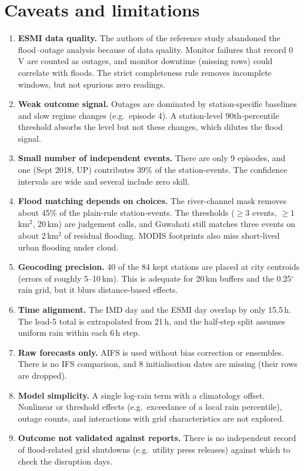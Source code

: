 \documentclass[11pt,a4paper]{article}
\begin{document}
\section{Caveats and limitations}
\begin{enumerate}
\item \textbf{ESMI data quality.} The authors of the reference study abandoned the flood--outage analysis
because of data quality. Monitor failures that record 0\,V are counted as outages, and monitor downtime
(missing rows) could correlate with floods. The strict completeness rule removes incomplete windows, but not
spurious zero readings.
\item \textbf{Weak outcome signal.} Outages are dominated by station-specific baselines and slow regime
changes (e.g.\ episode 4). A station-level 90th-percentile threshold absorbs the level but not these changes,
which dilutes the flood signal.
\item \textbf{Small number of independent events.} There are only 9 episodes, and one (Sept 2018, UP)
contributes 39\% of the station-events. The confidence intervals are wide and several include zero skill.
\item \textbf{Flood matching depends on choices.} The river-channel mask removes about 45\% of the plain-rule
station-events. The thresholds ($\ge3$ events, $\ge1$\,km$^2$, 20\,km) are judgement calls, and Guwahati still
matches three events on about 2\,km$^2$ of residual flooding. MODIS footprints also miss short-lived urban
flooding under cloud.
\item \textbf{Geocoding precision.} 40 of the 84 kept stations are placed at city centroids (errors of
roughly 5--10\,km). This is adequate for 20\,km buffers and the 0.25$^\circ$ rain grid, but it blurs
distance-based effects.
\item \textbf{Time alignment.} The IMD day and the ESMI day overlap by only 15.5\,h. The lead-5 total is
extrapolated from 21\,h, and the half-step split assumes uniform rain within each 6\,h step.
\item \textbf{Raw forecasts only.} AIFS is used without bias correction or ensembles. There is no IFS
comparison, and 8 initialisation dates are missing (their rows are dropped).
\item \textbf{Model simplicity.} A single log-rain term with a climatology offset. Nonlinear or threshold
effects (e.g.\ exceedance of a local rain percentile), outage counts, and interactions with grid
characteristics are not explored.
\item \textbf{Outcome not validated against reports.} There is no independent record of flood-related grid
shutdowns (e.g.\ utility press releases) against which to check the disruption days.
\end{enumerate}
\end{document}
